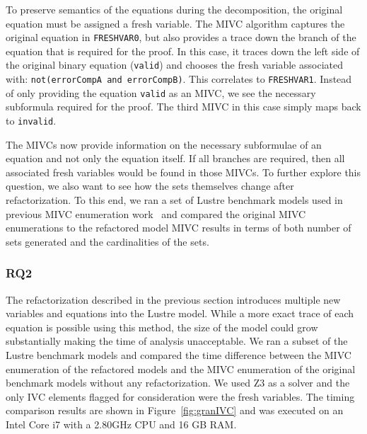 To preserve semantics of the equations during the decomposition, the original equation must be assigned a fresh variable. The MIVC algorithm captures the original equation in \texttt{FRESHVAR0}, but also provides a trace down the branch of the equation that is required for the proof. In this case, it traces down the left side of the original binary equation (\texttt{valid}) and chooses the fresh variable associated with: \texttt{not(errorCompA and errorCompB)}. This correlates to \texttt{FRESHVAR1}. Instead of only providing the equation \texttt{valid} as an MIVC, we see the necessary subformula required for the proof. The third MIVC in this case simply maps back to \texttt{invalid}. 

The MIVCs now provide information on the necessary subformulae of an equation and not only the equation itself. If all branches are required, then all associated fresh variables would be found in those MIVCs. To further explore this question, we also want to see how the sets themselves change after refactorization. To this end, we ran a set of Lustre benchmark models used in previous MIVC enumeration work~\cite{ghassabani_2018} and compared the original MIVC enumerations to the refactored model MIVC results in terms of both number of sets generated and the cardinalities of the sets. 

\subsubsection{RQ2}
The refactorization described in the previous section introduces multiple new variables and equations into the Lustre model. While a more exact trace of each equation is possible using this method, the size of the model could grow substantially making the time of analysis unacceptable. We ran a subset of the Lustre benchmark models and compared the time difference between the MIVC enumeration of the refactored models and the MIVC enumeration of the original benchmark models without any refactorization. We used Z3 as a solver and the only IVC elements flagged for consideration were the fresh variables. The timing comparison results are shown in Figure~\ref{fig:granIVC} and was executed on an Intel Core i7 with a 2.80GHz CPU and 16 GB RAM. 


